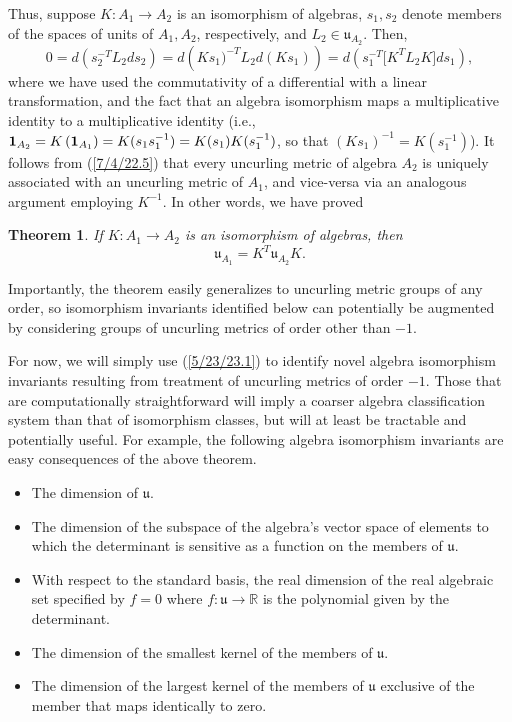 \documentclass{amsart}
\numberwithin{equation}{section}
\newtheorem{theorem}{Theorem}
\theoremstyle{definition}
\numberwithin{theorem}{section}
\begin{document}
Thus, suppose $K:A_1\rightarrow A_2$ is an isomorphism of algebras, $s_1,s_2$ denote members of the spaces of units of $A_1,A_2$, respectively, and $L_2\in \mathfrak{u}_{A_2}$.  Then, \begin{equation} 0 = d\left(s_2^{-T}L_2 ds_2\right) =  d\left(Ks_1)^{-T}L_2 d(Ks_1)\right) =d\left(s_1^{-T} \big[K^T L_2K\big]ds_1\right), \label{7/4/22.5}  \end{equation} where we have used the commutativity of a differential with a linear transformation, and the fact that an algebra isomorphism maps a multiplicative identity to a multiplicative identity (i.e., ${\bf 1}_{A_2} = K\left(\mathbf{1}_{A_1}\right) = K(s_1s_1^{-1}) = K(s_1)K(s_1^{-1})$, so that $(Ks_1)^{-1} = K(s_1^{-1})$).  It follows from (\ref{7/4/22.5}) that every uncurling metric of algebra $A_2$ is uniquely associated with an uncurling metric of $A_1$, and vice-versa via an analogous argument employing $K^{-1}$.  In other words, we have proved

\begin{theorem} \label{6/6/23.1} If $K:A_1\rightarrow A_2$ is an isomorphism of algebras, then \begin{equation}\label{5/23/23.1} \mathfrak{u}_{A_1} = K^T \mathfrak{u}_{A_2} K. \end{equation} \end{theorem}

Importantly, the theorem easily generalizes to uncurling metric groups of any order, so isomorphism invariants identified below can potentially be augmented by considering groups of uncurling metrics of order other than $-1$.

For now, we will simply use (\ref{5/23/23.1}) to identify novel algebra isomorphism invariants resulting from treatment of uncurling metrics of order $-1$. Those that are computationally straightforward will imply a coarser algebra classification system than that of isomorphism classes, but will at least be tractable and potentially useful.  For example, the following algebra isomorphism invariants are easy consequences of the above theorem.   
\begin{itemize} \item The dimension of $\mathfrak{u}$. \item The dimension of the subspace of the algebra's vector space of elements to which the determinant is sensitive as a function on the members of $\mathfrak{u}$. \item With respect to the standard basis, the real dimension of the real algebraic set specified by $f=0$ where $f:\mathfrak{u}\rightarrow \mathbb{R}$ is the polynomial given by the determinant.  \item The dimension of the smallest kernel of the members of $\mathfrak{u}$.  \item The dimension of the largest kernel of the members of $\mathfrak{u}$ exclusive of the member that maps identically to zero.\end{itemize} 
\end{document}
